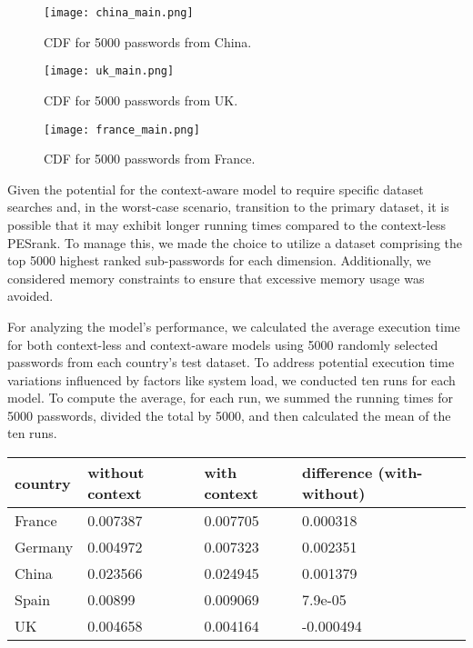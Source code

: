 \documentclass[5p,twocolumn]{elsarticle}
\begin{document}
\begin{figure}[h]
\centering 
\texttt{[image: china\_main.png]}
\caption{CDF for 5000 passwords from China.}
\label{fig_mom0}%
\end{figure}

\begin{figure}[h]
\centering 
\texttt{[image: uk\_main.png]}
\caption{CDF for 5000 passwords from UK.}
\label{fig_mom0}%
\end{figure}

\begin{figure}[h]
\centering 
\texttt{[image: france\_main.png]}
\caption{CDF for 5000 passwords from France.}
\label{fig_mom0}%
\end{figure}

Given the potential for the context-aware model to require specific dataset searches and, in the worst-case scenario, transition to the primary dataset, it is possible that it may exhibit longer running times compared to the context-less PESrank. To manage this, we made the choice to utilize a dataset comprising the top 5000 highest ranked sub-passwords for each dimension. Additionally, we considered memory constraints to ensure that excessive memory usage was avoided.

For analyzing the model's performance, we calculated the average execution time for both context-less and context-aware models using 5000 randomly selected passwords from each country's test dataset. To address potential execution time variations influenced by factors like system load, we conducted ten runs for each model. To compute the average, for each run, we summed the running times for 5000 passwords, divided the total by 5000, and then calculated the mean of the ten runs.

\begin{table}[h!]
\centering
 \begin{tabular}{|p{1.4cm}||p{1.4cm}|p{1.4cm}|p{2.4cm}|} 
 \hline
 country & without context & with context & difference (with-without) \\ [0.5ex] 
 \hline\hline
 France  & 0.007387 & 0.007705 & 0.000318 \\ 
 Germany & 0.004972 & 0.007323 & 0.002351 \\
 China & 0.023566 & 0.024945 & 0.001379 \\
 Spain & 0.00899 & 0.009069 & 7.9e-05 \\
 UK & 0.004658 & 0.004164 & -0.000494 \\ [1ex] 
 \hline
 \end{tabular}
\end{table}
\end{document}
